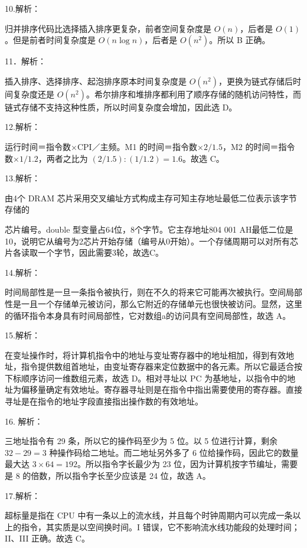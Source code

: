 \documentclass[UTF8,11pt]{ctexart}
\begin{document}
10.解析：


归并排序代码比选择插入排序更复杂，前者空间复杂度是 \(\displaystyle O(n)\)，后者是 \(\displaystyle O(1)\)。但是前者时间复杂度是 \(\displaystyle O(n\log n)\)，后者是 \(\displaystyle O(n^2)\)。所以 B 正确。


11．解析：


插入排序、选择排序、起泡排序原本时间复杂度是 \(\displaystyle O(n^2)\)，更换为链式存储后时间复杂度还是 \(\displaystyle O(n^2)\)。希尔排序和堆排序都利用了顺序存储的随机访问特性，而链式存储不支持这种性质，所以时间复杂度会增加，因此选 D。


12.解析：


运行时间＝指令数×CPI／主频。M1 的时间＝指令数×\(\displaystyle 2/1.5\)，M2 的时间＝指令数×\(\displaystyle 1/1.2\)，两者之比为 \(\displaystyle (2/1.5):(1/1.2)=1.6\)。故选 C。


13.解析：


由4个 DRAM 芯片采用交叉编址方式构成主存可知主存地址最低二位表示该字节存储的


芯片编号。double 型变量占64位，8个字节。它主存地址804 001 AH最低二位是10，说明它从编号为2芯片开始存储（编号从0开始）。一个存储周期可以对所有芯片各读取一个字节，因此需要3轮，故选C。


14.解析：


时间局部性是一旦一条指令被执行，则在不久的将来它可能再次被执行。空间局部性是一且一个存储单元被访问，那么它附近的存储单元也很快被访问。显然，这里的循环指令本身具有时间局部性，它对数组a的访问具有空间局部性，故选 A。


15.解析：


在变址操作时，将计算机指令中的地址与变址寄存器中的地址相加，得到有效地址，指令提供数组首地址，由变址寄存器来定位数据中的各元素。所以它最适合按下标顺序访问一维数组元素，故选 D。相对寻址以 PC 为基地址，以指令中的地址为偏移量确定有效地址。寄存器寻址则是在指令中指出需要使用的寄存器。直接寻址是在指令的地址字段直接指出操作数的有效地址。


16. 解析：


三地址指令有 29 条，所以它的操作码至少为 5 位。以 5 位进行计算，剩余 \(\displaystyle 32-29=3\) 种操作码给二地址。而二地址另外多了 6 位给操作码，因此它的数量最大达 \(\displaystyle 3\times64=192\)。所以指令字长最少为 23 位，因为计算机按字节编址，需要是 8 的倍数，所以指令字长至少应该是 24 位，故选 A。


17.解析：


超标量是指在 CPU 中有一条以上的流水线，并且每个时钟周期内可以完成一条以上的指令，其实质是以空间换时间。I 错误，它不影响流水线功能段的处理时间；II、III 正确。故选 C。
\end{document}
